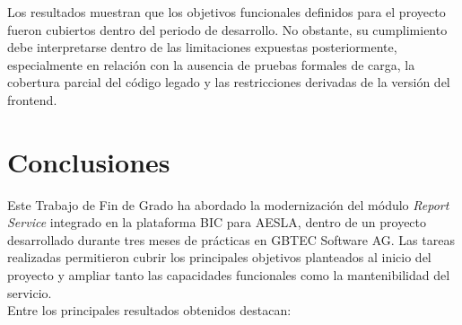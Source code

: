 \documentclass[11pt,a4paper,titlepage,oneside]{report}
\begin{document}
Los resultados muestran que los objetivos funcionales definidos para el
proyecto fueron cubiertos dentro del periodo de desarrollo. No obstante, su
cumplimiento debe interpretarse dentro de las limitaciones expuestas
posteriormente, especialmente en relación con la ausencia de pruebas formales
de carga, la cobertura parcial del código legado y las restricciones
derivadas de la versión del frontend.

\section{Conclusiones}

Este Trabajo de Fin de Grado ha abordado la modernización del módulo
\textit{Report Service} integrado en la plataforma BIC para AESLA, dentro de
un proyecto desarrollado durante tres meses de prácticas en GBTEC Software
AG. Las tareas realizadas permitieron cubrir los principales objetivos
planteados al inicio del proyecto y ampliar tanto las capacidades funcionales
como la mantenibilidad del servicio. \\

Entre los principales resultados obtenidos destacan:
\end{document}
